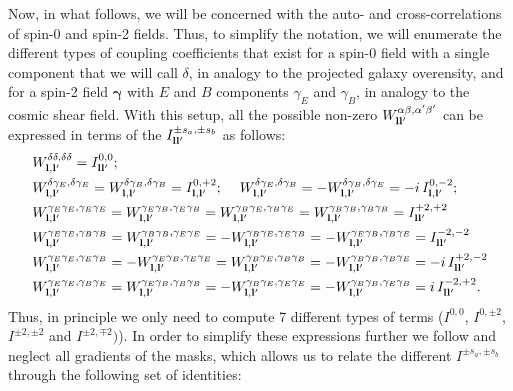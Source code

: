 \documentclass[a4paper,11pt]{article}
\begin{document}
      Now, in what follows, we will be concerned with the auto- and cross-correlations of spin-0 and spin-2 fields. Thus, to simplify the notation, we will enumerate the different types of coupling coefficients that exist for a spin-0 field with a single component that we will call $\delta$, in analogy to the projected galaxy overensity, and for a spin-2 field $\boldsymbol{\gamma}$ with $E$ and $B$ components $\gamma_E$ and $\gamma_B$, in analogy to the cosmic shear field. With this setup, all the possible non-zero $W^{\alpha\beta,\alpha'\beta'}_{{\bf l}{\bf l}'}$ can be expressed in terms of the $I^{\pm s_a,\pm s_b}_{{\bf l}{\bf l}'}$ as follows:
      \begin{align}\label{eq:coeff}
        &W^{\delta\delta,\delta\delta}_{{\bf l},{\bf l}'}=I^{0,0}_{{\bf l}{\bf l}'}; \\
        &W^{\delta\gamma_E,\delta\gamma_E}_{{\bf l},{\bf l}'}=W^{\delta\gamma_B,\delta\gamma_B}_{{\bf l},{\bf l}'}=I^{0,+2}_{{\bf l},{\bf l}'};\hspace{12pt}
        W^{\delta\gamma_E,\delta\gamma_B}_{{\bf l},{\bf l}'}=-W^{\delta\gamma_B,\delta\gamma_E}_{{\bf l},{\bf l}'}=-i\,I^{0,-2}_{{\bf l},{\bf l}'};\\
        &W^{\gamma_E\gamma_E,\gamma_E\gamma_E}_{{\bf l},{\bf l}'}=W^{\gamma_E\gamma_B,\gamma_E\gamma_B}_{{\bf l},{\bf l}'}=W^{\gamma_B\gamma_E,\gamma_B\gamma_E}_{{\bf l},{\bf l}'}=W^{\gamma_B\gamma_B,\gamma_B\gamma_B}_{{\bf l},{\bf l}'}=I^{+2,+2}_{{\bf l}{\bf l}'}\\
        &W^{\gamma_E\gamma_E,\gamma_B\gamma_B}_{{\bf l},{\bf l}'}=W^{\gamma_B\gamma_B,\gamma_E\gamma_E}_{{\bf l},{\bf l}'}=-W^{\gamma_B\gamma_E,\gamma_E\gamma_B}_{{\bf l},{\bf l}'}=-W^{\gamma_E\gamma_B,\gamma_B\gamma_E}_{{\bf l},{\bf l}'}=I^{-2,-2}_{{\bf l}{\bf l}'}\\
        &W^{\gamma_E\gamma_E,\gamma_E\gamma_B}_{{\bf l},{\bf l}'}=-W^{\gamma_E\gamma_B,\gamma_E\gamma_E}_{{\bf l},{\bf l}'}=W^{\gamma_B\gamma_E,\gamma_B\gamma_B}_{{\bf l},{\bf l}'}=-W^{\gamma_B\gamma_B,\gamma_B\gamma_E}_{{\bf l},{\bf l}'}=-i\,I^{+2,-2}_{{\bf l}{\bf l}'}\\
        &W^{\gamma_E\gamma_E,\gamma_B\gamma_E}_{{\bf l},{\bf l}'}=W^{\gamma_E\gamma_B,\gamma_B\gamma_B}_{{\bf l},{\bf l}'}=-W^{\gamma_B\gamma_E,\gamma_E\gamma_E}_{{\bf l},{\bf l}'}=-W^{\gamma_B\gamma_B,\gamma_E\gamma_B}_{{\bf l},{\bf l}'}=i\,I^{-2,+2}_{{\bf l}{\bf l}'}.
      \end{align}
      Thus, in principle we only need to compute 7 different types of terms ($I^{0,0}$, $I^{0,\pm2}$, $I^{\pm2,\pm2}$ and $I^{\pm2,\mp2})$). In order to simplify these expressions further we follow \cite{2017A&A...602A..41C} and neglect all gradients of the masks, which allows us to relate the different $I^{\pm s_a,\pm s_b}$ through the following set of identities:
\end{document}
